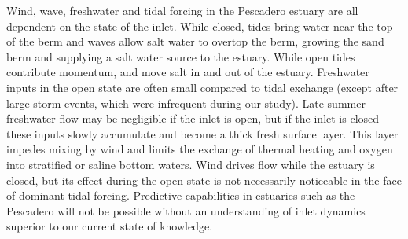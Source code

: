 Wind, wave, freshwater and tidal forcing in the Pescadero estuary are all dependent on the state of the inlet.  While closed, tides bring water near the top of the berm and waves allow salt water to overtop the berm, growing the sand berm and supplying a salt water source to the estuary. While open tides contribute momentum, and move salt in and out of the estuary. Freshwater inputs in the open state are often small compared to tidal exchange (except after large storm events, which were infrequent during our study). Late-summer freshwater flow may be negligible if the inlet is open, but if the inlet is closed these inputs slowly accumulate and become a thick fresh surface layer. This layer impedes mixing by wind and limits the exchange of thermal heating and oxygen into stratified or saline bottom waters. Wind drives flow while the estuary is closed, but its effect during the open state is not necessarily noticeable in the face of dominant tidal forcing. Predictive capabilities in estuaries such as the Pescadero will not be possible without an understanding of inlet dynamics superior to our current state of knowledge.  
